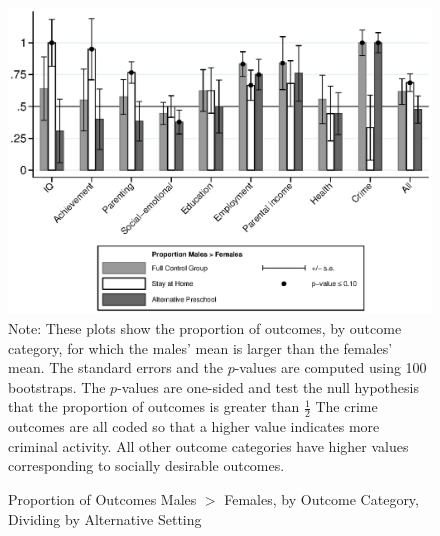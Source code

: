 \begin{figure}[!htbp]
\centering
\caption{Proportion of Outcomes Males $>$ Females, by Outcome Category, Dividing by Alternative Setting}
\label{fig:proportion-altpre}
	\includegraphics[width=\textwidth]{output/gendergaps-control-moderated-altpre}
\footnotesize \justify
Note: These plots show the proportion of outcomes, by outcome category, for which the males' mean is larger than the females' mean. The standard errors and the $p$-values are computed using 100 bootstraps. The $p$-values are one-sided and test the null hypothesis that the proportion of outcomes is greater than $\frac{1}{2}$ The crime outcomes are all coded so that a higher value indicates more criminal activity. All other outcome categories have higher values corresponding to socially desirable outcomes. 
\end{figure}

